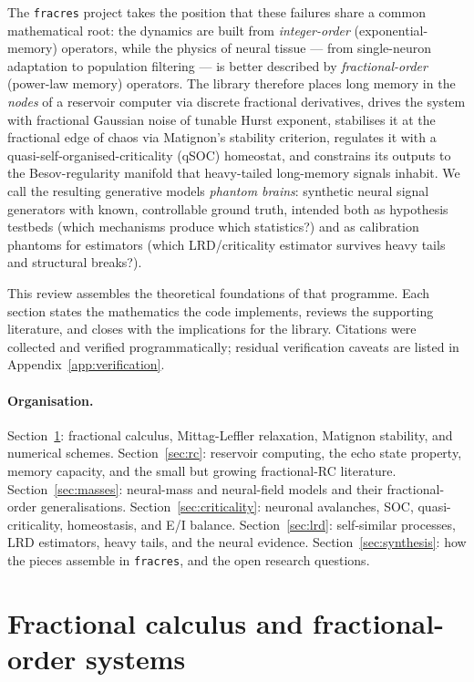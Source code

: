 \documentclass[11pt,a4paper]{article}
\begin{document}
The \texttt{fracres} project takes the position that these failures share a
common mathematical root: the dynamics are built from \emph{integer-order}
(exponential-memory) operators, while the physics of neural tissue --- from
single-neuron adaptation \cite{lundstrom2008fractional} to population
filtering --- is better described by \emph{fractional-order} (power-law
memory) operators. The library therefore places long memory in the
\emph{nodes} of a reservoir computer via discrete fractional derivatives,
drives the system with fractional Gaussian noise of tunable Hurst exponent,
stabilises it at the fractional edge of chaos via Matignon's stability
criterion, regulates it with a quasi-self-organised-criticality (qSOC)
homeostat, and constrains its outputs to the Besov-regularity manifold that
heavy-tailed long-memory signals inhabit. We call the resulting generative
models \emph{phantom brains}: synthetic neural signal generators with known,
controllable ground truth, intended both as hypothesis testbeds (which
mechanisms produce which statistics?) and as calibration phantoms for
estimators (which LRD/criticality estimator survives heavy tails and
structural breaks?).

This review assembles the theoretical foundations of that programme. Each
section states the mathematics the code implements, reviews the supporting
literature, and closes with the implications for the library. Citations were
collected and verified programmatically; residual verification caveats are
listed in Appendix~\ref{app:verification}.

\paragraph{Organisation.}
Section~\ref{sec:fractional}: fractional calculus, Mittag-Leffler relaxation,
Matignon stability, and numerical schemes.
Section~\ref{sec:rc}: reservoir computing, the echo state property, memory
capacity, and the small but growing fractional-RC literature.
Section~\ref{sec:masses}: neural-mass and neural-field models and their
fractional-order generalisations.
Section~\ref{sec:criticality}: neuronal avalanches, SOC, quasi-criticality,
homeostasis, and E/I balance.
Section~\ref{sec:lrd}: self-similar processes, LRD estimators, heavy tails,
and the neural evidence.
Section~\ref{sec:synthesis}: how the pieces assemble in \texttt{fracres}, and
the open research questions.

\section{Fractional calculus and fractional-order systems}
\label{sec:fractional}
\end{document}
